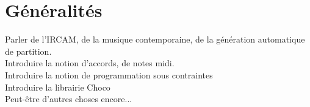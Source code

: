 \section{Généralités}

Parler de l'IRCAM, de la musique contemporaine, de la génération automatique de
partition.\\
Introduire la notion d'accords, de notes midi.\\
Introduire la notion de programmation sous contraintes\\
Introduire la librairie Choco\\
Peut-être d'autres choses encore...
